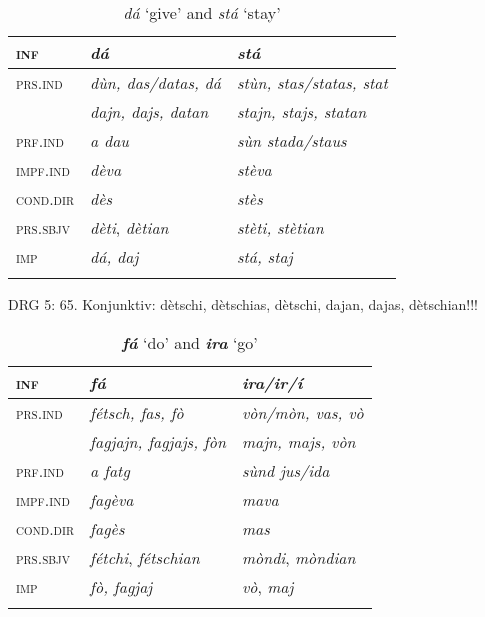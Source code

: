 \begin{table}
	\caption{\textit{dá} `give' and \textit{stá} `stay'}

	\begin{tabular}{lll}
		\lsptoprule
		\textsc{inf} & \textit{\textbf{dá}} & \textit{\textbf{stá}}\\
		\midrule
		
		\textsc{prs.ind} & \textit{dùn, das/datas, dá} & \textit{stùn, stas/statas, stat}\\
		& \textit{dajn, dajs, datan} & \textit{stajn, stajs, statan}\\
		\textsc{prf.ind} & \textit{a dau} & \textit{sùn stada/staus}\\
		\textsc{impf.ind} & \textit{dèva} & \textit{stèva}\\
		\textsc{cond.dir} & \textit{dès} & \textit{stès}\\
		\textsc{prs.sbjv}	& \textit{dèti}, \textit{dètian} & \textit{stèti, stètian}\\
		\textsc{imp} & \textit{dá, daj} & \textit{stá, staj}\\
		\lspbottomrule
	\end{tabular}
\end{table}

DRG 5: 65. Konjunktiv: dètschi, dètschias, dètschi, dajan, dajas, dètschian!!!


\begin{table}
	\caption{\textit{\textbf{fá}} `do' and \textit{\textbf{ira}} `go'}

\begin{tabular}{lll}
	\lsptoprule
	\textsc{inf} & \textit{\textbf{fá}} & \textit{\textbf{ira/ir/í}}\\
	\midrule
	\textsc{prs.ind} & \textit{fétsch, fas, fò} & \textit{vòn/mòn, vas, vò}\\
	& \textit{fagjajn, fagjajs, fòn} & \textit{majn, majs, vòn}\\
	\textsc{prf.ind} & \textit{a fatg} & \textit{sùnd jus/ida}\\
	\textsc{impf.ind} & \textit{fagèva} & \textit{mava}\\
	\textsc{cond.dir} & \textit{fagès} & \textit{mas}\\
	\textsc{prs.sbjv} & \textit{fétchi}, \textit{fétschian} & \textit{mòndi}, \textit{mòndian} \\
	\textsc{imp} & \textit{fò, fagjaj} & \textit{vò}, \textit{maj} \\
	\lspbottomrule
\end{tabular}
\end{table}


